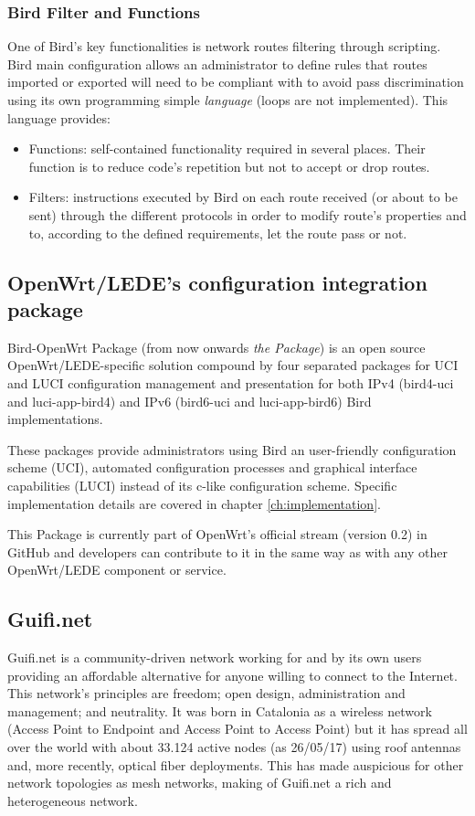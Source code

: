 \subsubsection{Bird Filter and Functions}
\label{sub:sub:filfun}
One of Bird's key functionalities is network routes filtering through scripting. Bird main configuration allows an administrator to define rules that routes imported or exported will need to be compliant with to avoid pass discrimination using its own programming simple \textit{language} (loops are not implemented). This language provides:
\begin{itemize}
    \item Functions: self-contained functionality required in several places. Their function is to reduce code's repetition but not to accept or drop routes.
    \item Filters: instructions executed by Bird on each route received (or about to be sent) through the different protocols in order to modify route's properties and to, according to the defined requirements, let the route pass or not.     
\end{itemize} 

\subsection{OpenWrt/LEDE's configuration integration package}
Bird-OpenWrt Package (from now onwards \textit{the Package}) is an open source OpenWrt/LEDE-specific solution compound by four separated packages for UCI and LUCI configuration management and presentation for both IPv4 (bird4-uci and luci-app-bird4) and IPv6 (bird6-uci and luci-app-bird6) Bird implementations.

These packages provide administrators using Bird an user-friendly configuration scheme (UCI), automated configuration processes and graphical interface capabilities (LUCI) instead of its c-like configuration scheme. Specific implementation details are covered in chapter \ref{ch:implementation}.

This Package is currently part of OpenWrt's official stream (version 0.2) in GitHub and developers can contribute to it in the same way as with any other OpenWrt/LEDE component or service.

\subsection{Guifi.net}
\label{subsec:gn}
Guifi.net is a community-driven network working for and by its own users providing an affordable alternative for anyone willing to connect to the Internet. This network's principles are freedom; open design, administration and management; and neutrality. It was born in Catalonia as a wireless network (Access Point to Endpoint and Access Point to Access Point) but it has spread all over the world with about 33.124 active nodes (as 26/05/17) using roof antennas and, more recently, optical fiber deployments. This has made auspicious for other network topologies as mesh networks, making of Guifi.net a rich and heterogeneous network.

